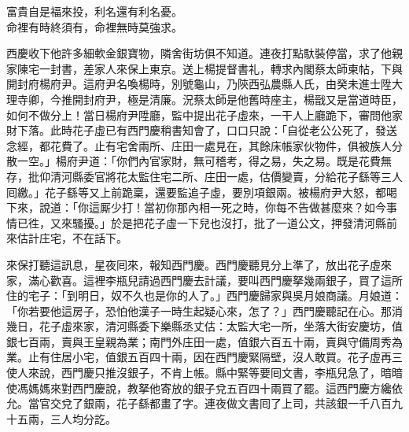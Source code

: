 \begin{myquote}
富貴自是福來投，利名還有利名憂。\\命裡有時終須有，命裡無時莫強求。
\end{myquote}

西慶收下他許多細軟金銀寶物，隣舍街坊俱不知道。連夜打點馱裝停當，求了他親家陳宅一封書，差家人來保上東京。送上楊提督書礼，轉求內閣蔡太師柬帖，下與開封府楊府尹。這府尹名喚楊時，別號龜山，乃陝西弘農縣人氏，由癸未進士陞大理寺卿，今推開封府尹，極是清廉。況蔡太師是他舊時座主，楊戩又是當道時臣，如何不做分上！{}當日楊府尹陞廳，監中提出花子虛來，一干人上廳跪下，審問他家財下落。此時花子虛已有西門慶稍書知會了，口口只說：「自從老公公死了，發送念經，都花費了。止有宅舍兩所、庄田一處見在，其餘床帳家伙物件，俱被族人分散一空。」楊府尹道：「你們內官家財，無可稽考，得之易，失之易。既是花費無存，批仰清河縣委官將花太監住宅二所、庄田一處，估價變賣，分給花子繇等三人囘繳。」花子繇等又上前跪稟，還要監追子虛，要別項銀兩。被楊府尹大怒，都喝下來，說道：「你這厮少打！當初你那內相一死之時，你每不告做甚麼來？如今事情已徃，又來騷擾。」於是把花子虛一下兒也沒打，批了一道公文，押發清河縣前來估計庄宅，不在話下。

來保打聽這訊息，星夜囘來，報知西門慶。西門慶聽見分上準了，放出花子虛來家，滿心歡喜。這裡李瓶兒請過西門慶去計議，要叫西門慶拏幾兩銀子，買了這所住的宅子：「到明日，奴不久也是你的人了。」{}西門慶歸家與吳月娘商議。月娘道：「你若要他這房子，恐怕他漢子一時生起疑心來，怎了？」西門慶聽記在心。那消幾日，花子虛來家，清河縣委下樂縣丞丈估：太監大宅一所，坐落大街安慶坊，值銀七百兩，賣與王皇親為業；南門外庄田一處，值銀六百五十兩，賣與守備周秀為業。止有住居小宅，值銀五百四十兩，因在西門慶緊隔壁，沒人敢買。花子虛再三使人來說，西門慶只推沒銀子，不肯上帳。縣中緊等要囘文書，李瓶兒急了，暗暗使馮媽媽來對西門慶說，教拏他寄放的銀子兌五百四十兩買了罷。這西門慶方纔依允。當官交兌了銀兩，花子繇都畫了字。連夜做文書囘了上司，共該銀一千八百九十五兩，三人均分訖。

